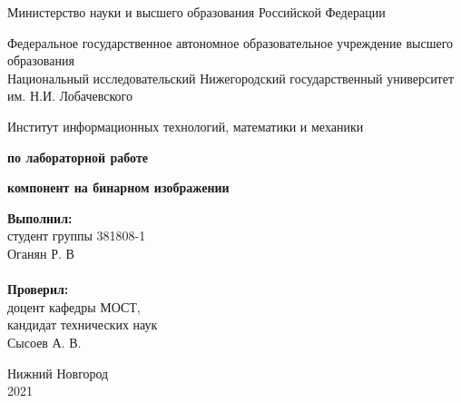 \documentclass{report}
\begin{document}
\begin{titlepage}

\begin{center}
Министерство науки и высшего образования Российской Федерации
\end{center}

\begin{center}
Федеральное государственное автономное образовательное учреждение высшего образования \\
Национальный исследовательский Нижегородский государственный университет им. Н.И. Лобачевского
\end{center}

\begin{center}
Институт информационных технологий, математики и механики
\end{center}

\vspace{4em}

\begin{center}
\textbf{ по лабораторной работе} \\
\end{center}
\begin{center}
\textbf{ компонент на бинарном изображении} \\
\end{center}

\vspace{4em}

	\newbox{\lbox}
		\newlength{\maxl}
		\setlength{\maxl}{\wd\lbox}
		\hfill\parbox{7cm}{
			\hspace*{5cm}\hspace*{-5cm}\textbf{Выполнил:} \\ студент группы 381808-1 \\ Оганян Р. В\\
			\\
			\hspace*{5cm}\hspace*{-5cm}\textbf{Проверил:}\\ доцент кафедры МОСТ, \\ кандидат технических наук \\ Сысоев А. В.\\
		}
		\vspace{\fill}

		\begin{center} Нижний Новгород \\ 2021 \end{center}

	\end{titlepage}
\end{document}
